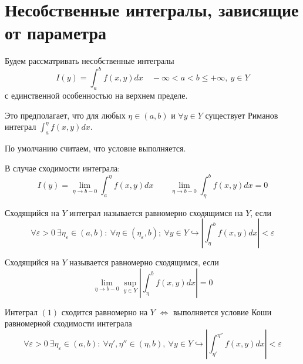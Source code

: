 \documentclass{article}
\theoremstyle{definition}
\numberwithin{theorem}{section}
\numberwithin{lemma}{section}
\numberwithin{definition}{section}
\numberwithin{corollary}{section}
\numberwithin{equation}{section}
\let\epsilon\varepsilon
\let\iff\Leftrightarrow
\let\true\hookrightarrow
\begin{document}
\section{Несобственные интегралы, зависящие от параметра}
Будем рассматривать несобственные интегралы
\[
  I(y)=\int_{a}^{b}f(x,y)dx \quad-\infty < a < b \le +\infty, \ y\in Y \tag{1}
\]
с единственной особенностью на верхнем пределе.

Это предполагает, что для любых $\eta \in (a,b)$ и $\forall y \in Y$ 
существует Риманов интеграл $\int_{a}^{\eta}f(x,y)dx$.

По умолчанию считаем, что условие выполняется.

В случае сходимости интеграла:
\[
  I(y)=\lim_{\eta \to b-0}\int_{a}^{\eta}f(x,y)dx \qquad
  \lim_{\eta\to b-0}\int_{\eta}^{b}f(x,y)dx=0
\]
\begin{definition}
  Сходящийся на $Y$ интеграл называется равномерно сходящимся на $Y$, если
  \[
    \forall \epsilon > 0 \ \exists \eta_{\epsilon}\in(a,b): \ \forall \eta \in (\eta_\epsilon,b); \ \forall y \in Y 
    \true |\int_{\eta}^{b}f(x,y)dx|<\epsilon
  \]
\end{definition}
\begin{definition}[Перефразирование]
  Сходящийся на $Y$ называется равномерно сходящимся, если 
  \[
    \lim_{\eta\to b-0}\sup_{y\in Y}|\int_{\eta}^{b}f(x,y)dx|=0
  \]
\end{definition}
\begin{theorem}
  Интеграл $(1)$ сходится равномерно на $Y$ 
  $\iff$ выполняется условие Коши равномерной сходимости интеграла
  \[
    \forall \epsilon>0 \ \exists \eta_\epsilon \in (a,b): \ \forall \eta',\eta'' \in (\eta,b), \ \forall y \in Y 
    \true |\int_{\eta'}^{\eta''}f(x,y)dx| < \epsilon
  \]
\end{theorem}
\end{document}
